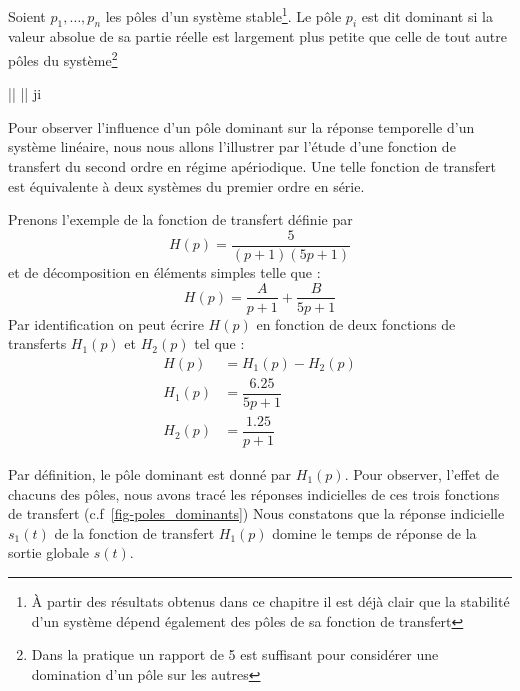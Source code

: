 Soient $p_1,\ldots,p_n$ les pôles d'un système stable\footnote{À partir 
des résultats obtenus dans ce chapitre il est déjà clair que la stabilité
d'un système dépend également des pôles de sa fonction de transfert}.
Le pôle $p_i$ est dit dominant si la valeur absolue
de sa partie réelle est largement plus petite que celle de tout autre pôles 
du système\footnote{Dans la pratique un rapport de 5 est 
suffisant pour considérer une domination d'un pôle sur les autres}
\begin{bequation}
    \big|\big| \ll \big|\big|\;\; \forall j\neq i
\end{bequation}

Pour observer l'influence d'un pôle dominant sur 
la réponse temporelle d'un système linéaire, nous
nous allons l'illustrer par l'étude d'une fonction 
de transfert du second ordre en régime apériodique.
Une telle fonction de transfert est équivalente à deux
systèmes du premier ordre en série.

Prenons l'exemple de la fonction de transfert définie par  
\begin{equation}
H(p)=\dfrac{5}{(p+1)(5p+1)}\label{eq-ft-chap6}
\end{equation}
et de décomposition en éléments simples telle que :
$$
H(p)=\dfrac{A}{p+1}+\dfrac{B}{5p+1}
$$
Par identification on peut écrire $H(p)$ en fonction de
deux fonctions de transferts $H_1(p)$ et $H_2(p)$ tel que :
\begin{align*}
	H(p)&=H_1(p)-H_2(p)\\
	H_1(p)&=\dfrac{6.25}{5p+1}\\
	H_2(p)&=\dfrac{1.25}{p+1}
\end{align*}

Par définition, le pôle dominant est donné par $H_1(p)$.
Pour observer, l'effet de chacuns des pôles, nous avons tracé 
les réponses indicielles de ces trois fonctions de transfert
(c.f~\cref{fig-poles_dominants})
Nous constatons que la réponse indicielle $s_1(t)$ de la fonction
de transfert $H_1(p)$ domine le temps de réponse de la sortie
globale $s(t)$.

